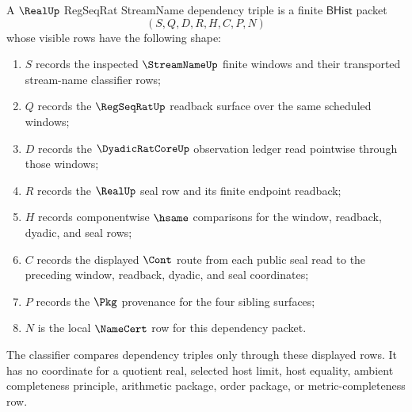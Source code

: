 \begin{definition}
\label{def:real-regseq-streamname-dependency-triple}
A $\RealUp$ RegSeqRat StreamName dependency triple is a finite
$\mathsf{BHist}$ packet
$$
(S,Q,D,R,H,C,P,N)
$$
whose visible rows have the following shape:
\begin{enumerate}
\item $S$ records the inspected $\StreamNameUp$ finite windows and their
  transported stream-name classifier rows;
\item $Q$ records the $\RegSeqRatUp$ readback surface over the same scheduled
  windows;
\item $D$ records the $\DyadicRatCoreUp$ observation ledger read pointwise
  through those windows;
\item $R$ records the $\RealUp$ seal row and its finite endpoint readback;
\item $H$ records componentwise $\hsame$ comparisons for the window,
  readback, dyadic, and seal rows;
\item $C$ records the displayed $\Cont$ route from each public seal read to
  the preceding window, readback, dyadic, and seal coordinates;
\item $P$ records the $\Pkg$ provenance for the four sibling surfaces;
\item $N$ is the local $\NameCert$ row for this dependency packet.
\end{enumerate}
The classifier compares dependency triples only through these displayed rows.
It has no coordinate for a quotient real, selected host limit, host equality,
ambient completeness principle, arithmetic package, order package, or
metric-completeness row.
\end{definition}

